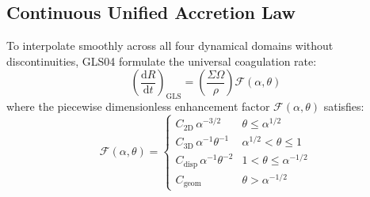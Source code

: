 \documentclass[11pt,a4paper]{article}
\begin{document}
\subsection{Continuous Unified Accretion Law}
To interpolate smoothly across all four dynamical domains without discontinuities, GLS04 formulate the universal coagulation rate:
\begin{equation}
\left(\frac{\mathrm{d}R}{\mathrm{d}t}\right)_{\text{GLS}} = \left(\frac{\Sigma \Omega}{\rho}\right) \mathcal{F}(\alpha, \theta)
\label{eq:unified_growth}
\end{equation}
where the piecewise dimensionless enhancement factor $\mathcal{F}(\alpha, \theta)$ satisfies:
\begin{equation}
\mathcal{F}(\alpha, \theta) = \begin{cases} 
C_{\text{2D}} \, \alpha^{-3/2} & \theta \le \alpha^{1/2} \\[4pt]
C_{\text{3D}} \, \alpha^{-1} \theta^{-1} & \alpha^{1/2} < \theta \le 1 \\[4pt]
C_{\text{disp}} \, \alpha^{-1} \theta^{-2} & 1 < \theta \le \alpha^{-1/2} \\[4pt]
C_{\text{geom}} & \theta > \alpha^{-1/2}
\end{cases}
\label{eq:f_enhancement}
\end{equation}
\end{document}
